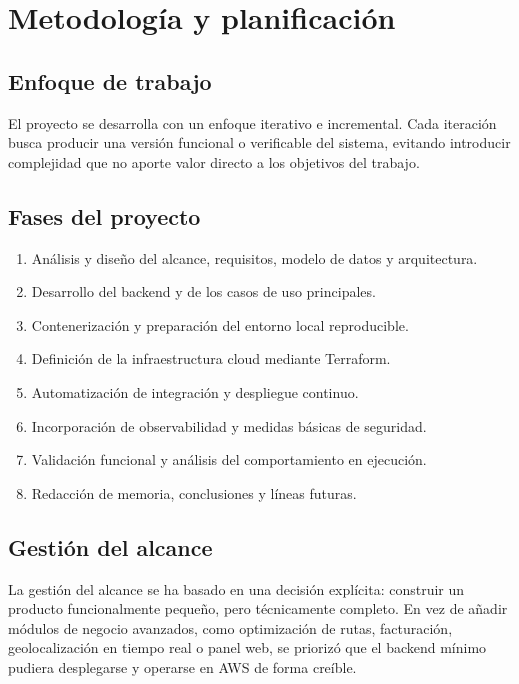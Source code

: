 \chapter{Metodología y planificación}
\label{chap:metodologia}

\section{Enfoque de trabajo}
\label{sec:enfoque-trabajo}

El proyecto se desarrolla con un enfoque iterativo e incremental. Cada iteración busca producir una versión funcional o verificable del sistema, evitando introducir complejidad que no aporte valor directo a los objetivos del trabajo.

\section{Fases del proyecto}
\label{sec:fases-proyecto}

\begin{enumerate}
  \item Análisis y diseño del alcance, requisitos, modelo de datos y arquitectura.
  \item Desarrollo del backend y de los casos de uso principales.
  \item Contenerización y preparación del entorno local reproducible.
  \item Definición de la infraestructura cloud mediante Terraform.
  \item Automatización de integración y despliegue continuo.
  \item Incorporación de observabilidad y medidas básicas de seguridad.
  \item Validación funcional y análisis del comportamiento en ejecución.
  \item Redacción de memoria, conclusiones y líneas futuras.
\end{enumerate}

\section{Gestión del alcance}
\label{sec:gestion-alcance}

La gestión del alcance se ha basado en una decisión explícita: construir un producto funcionalmente pequeño, pero técnicamente completo. En vez de añadir módulos de negocio avanzados, como optimización de rutas, facturación, geolocalización en tiempo real o panel web, se priorizó que el backend mínimo pudiera desplegarse y operarse en AWS de forma creíble.


